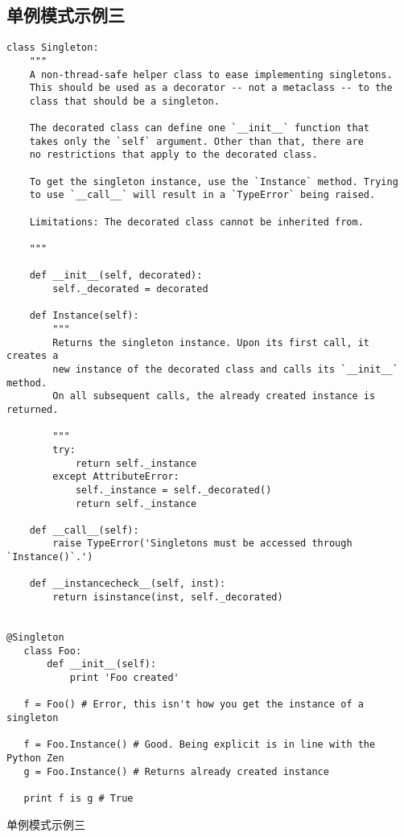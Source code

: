 \documentclass{article}
\begin{document}
\subsection{单例模式示例三}
\begin{listing}[H]
\begin{verbatim}
class Singleton:
    """
    A non-thread-safe helper class to ease implementing singletons.
    This should be used as a decorator -- not a metaclass -- to the
    class that should be a singleton.

    The decorated class can define one `__init__` function that
    takes only the `self` argument. Other than that, there are
    no restrictions that apply to the decorated class.

    To get the singleton instance, use the `Instance` method. Trying
    to use `__call__` will result in a `TypeError` being raised.

    Limitations: The decorated class cannot be inherited from.

    """

    def __init__(self, decorated):
        self._decorated = decorated

    def Instance(self):
        """
        Returns the singleton instance. Upon its first call, it creates a
        new instance of the decorated class and calls its `__init__` method.
        On all subsequent calls, the already created instance is returned.

        """
        try:
            return self._instance
        except AttributeError:
            self._instance = self._decorated()
            return self._instance

    def __call__(self):
        raise TypeError('Singletons must be accessed through `Instance()`.')

    def __instancecheck__(self, inst):
        return isinstance(inst, self._decorated)


@Singleton
   class Foo:
       def __init__(self):
           print 'Foo created'

   f = Foo() # Error, this isn't how you get the instance of a singleton

   f = Foo.Instance() # Good. Being explicit is in line with the Python Zen
   g = Foo.Instance() # Returns already created instance

   print f is g # True
\end{verbatim}
\label{singleton2}
\caption{单例模式示例三}
\end{listing}
\end{document}
